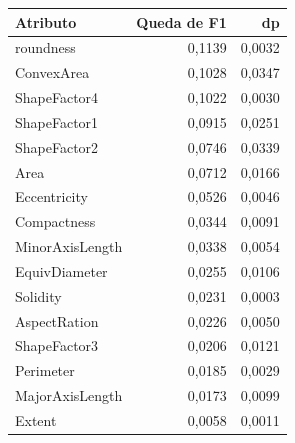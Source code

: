 \begin{tabular}{lrr}
\toprule
Atributo & Queda de F1 & dp \\
\midrule
roundness & 0,1139 & 0,0032 \\
ConvexArea & 0,1028 & 0,0347 \\
ShapeFactor4 & 0,1022 & 0,0030 \\
ShapeFactor1 & 0,0915 & 0,0251 \\
ShapeFactor2 & 0,0746 & 0,0339 \\
Area & 0,0712 & 0,0166 \\
Eccentricity & 0,0526 & 0,0046 \\
Compactness & 0,0344 & 0,0091 \\
MinorAxisLength & 0,0338 & 0,0054 \\
EquivDiameter & 0,0255 & 0,0106 \\
Solidity & 0,0231 & 0,0003 \\
AspectRation & 0,0226 & 0,0050 \\
ShapeFactor3 & 0,0206 & 0,0121 \\
Perimeter & 0,0185 & 0,0029 \\
MajorAxisLength & 0,0173 & 0,0099 \\
Extent & 0,0058 & 0,0011 \\
\bottomrule
\end{tabular}

